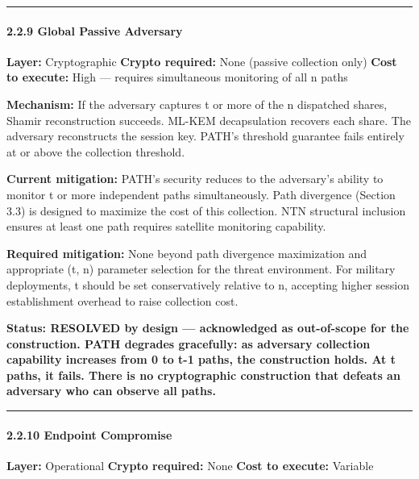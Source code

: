 \documentclass[
  11pt,
]{article}
\begin{document}
\begin{center}\rule{0.5\linewidth}{0.5pt}\end{center}

\hypertarget{global-passive-adversary}{%
\paragraph{2.2.9 Global Passive
Adversary}\label{global-passive-adversary}}

\textbf{Layer:} Cryptographic \textbf{Crypto required:} None (passive
collection only) \textbf{Cost to execute:} High --- requires
simultaneous monitoring of all n paths

\textbf{Mechanism:} If the adversary captures t or more of the n
dispatched shares, Shamir reconstruction succeeds. ML-KEM decapsulation
recovers each share. The adversary reconstructs the session key. PATH's
threshold guarantee fails entirely at or above the collection threshold.

\textbf{Current mitigation:} PATH's security reduces to the adversary's
ability to monitor t or more independent paths simultaneously. Path
divergence (Section 3.3) is designed to maximize the cost of this
collection. NTN structural inclusion ensures at least one path requires
satellite monitoring capability.

\textbf{Required mitigation:} None beyond path divergence maximization
and appropriate (t, n) parameter selection for the threat environment.
For military deployments, t should be set conservatively relative to n,
accepting higher session establishment overhead to raise collection
cost.

\textbf{Status: RESOLVED by design --- acknowledged as out-of-scope for
the construction. PATH degrades gracefully: as adversary collection
capability increases from 0 to t-1 paths, the construction holds. At t
paths, it fails. There is no cryptographic construction that defeats an
adversary who can observe all paths.}

\begin{center}\rule{0.5\linewidth}{0.5pt}\end{center}

\hypertarget{endpoint-compromise}{%
\paragraph{2.2.10 Endpoint Compromise}\label{endpoint-compromise}}

\textbf{Layer:} Operational \textbf{Crypto required:} None \textbf{Cost
to execute:} Variable
\end{document}
